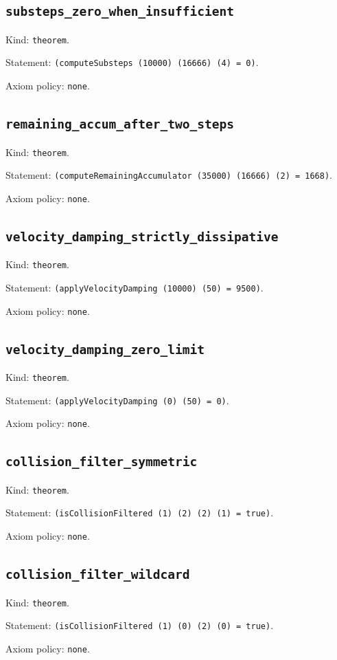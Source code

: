 \documentclass[11pt]{article}
\begin{document}
\subsection*{\texttt{substeps\_zero\_when\_insufficient}}
\noindent Kind: \texttt{theorem}.\par
\noindent Statement: \texttt{(computeSubsteps (10000) (16666) (4) = 0)}.\par
\noindent Axiom policy: \texttt{none}.\par
\subsection*{\texttt{remaining\_accum\_after\_two\_steps}}
\noindent Kind: \texttt{theorem}.\par
\noindent Statement: \texttt{(computeRemainingAccumulator (35000) (16666) (2) = 1668)}.\par
\noindent Axiom policy: \texttt{none}.\par
\subsection*{\texttt{velocity\_damping\_strictly\_dissipative}}
\noindent Kind: \texttt{theorem}.\par
\noindent Statement: \texttt{(applyVelocityDamping (10000) (50) = 9500)}.\par
\noindent Axiom policy: \texttt{none}.\par
\subsection*{\texttt{velocity\_damping\_zero\_limit}}
\noindent Kind: \texttt{theorem}.\par
\noindent Statement: \texttt{(applyVelocityDamping (0) (50) = 0)}.\par
\noindent Axiom policy: \texttt{none}.\par
\subsection*{\texttt{collision\_filter\_symmetric}}
\noindent Kind: \texttt{theorem}.\par
\noindent Statement: \texttt{(isCollisionFiltered (1) (2) (2) (1) = true)}.\par
\noindent Axiom policy: \texttt{none}.\par
\subsection*{\texttt{collision\_filter\_wildcard}}
\noindent Kind: \texttt{theorem}.\par
\noindent Statement: \texttt{(isCollisionFiltered (1) (0) (2) (0) = true)}.\par
\noindent Axiom policy: \texttt{none}.\par
\end{document}
